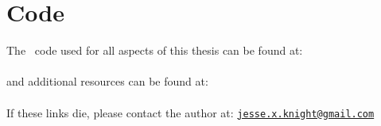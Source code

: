 \chapter{Code}
The \matlab\ code used for all aspects of this thesis can be found at:\\
\\
and additional resources can be found at:\\
\\
If these links die, please contact the author at:
\href{mailto:jesse.x.knight@gmail.com}{\footnotesize{\texttt{jesse.x.knight@gmail.com}}}\\
